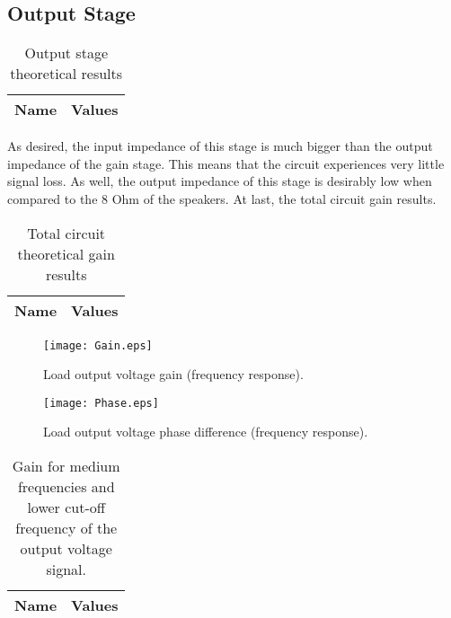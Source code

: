 \subsection{Output Stage}
\begin{table}[h]
  \centering
  \begin{tabular}{|l|r|}
    \hline    
    {\bf Name} & {\bf Values} \\ \hline
     
  \end{tabular}
  \caption{Output stage theoretical results}
  \label{tab:output}
\end{table}
As desired, the input impedance of this stage is much bigger than the output impedance of the gain stage. This means that the circuit experiences very little signal loss. As well, the output impedance of this stage is desirably low when compared to the 8 Ohm of the speakers.
At last, the total circuit gain results.
\begin{table}[h]
  \centering
  \begin{tabular}{|l|r|}
    \hline    
    {\bf Name} & {\bf Values} \\ \hline
     
  \end{tabular}
  \caption{Total circuit theoretical gain results}
  \label{tab:output}
\end{table}

\begin{figure}[!h] \centering
\texttt{[image: Gain.eps]}
\caption{Load output voltage gain (frequency response).}
\label{fig:gainfreq}
\end{figure}

\begin{figure}[!h] \centering
\texttt{[image: Phase.eps]}
\caption{Load output voltage phase difference (frequency response).}
\label{fig:phasefreq}
\end{figure}

\begin{table}[h]
  \centering
  \begin{tabular}{|l|r|}
    \hline    
    {\bf Name} & {\bf Values} \\ \hline
     
  \end{tabular}
  \caption{Gain for medium frequencies and lower cut-off frequency of the output voltage signal.}
  \label{tab:freq}
\end{table}
